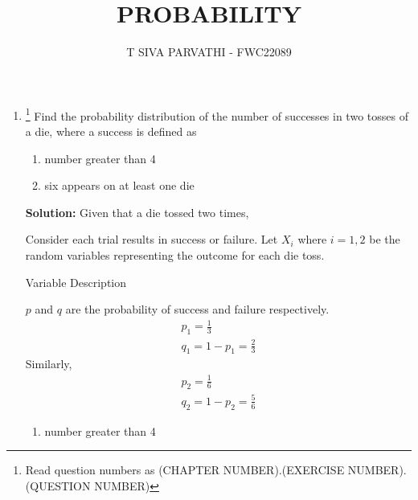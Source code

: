 \documentclass{article}
\newcommand{\solution}{\noindent \textbf{Solution: }}
\begin{document}
\title{PROBABILITY}
\author{\Large T SIVA PARVATHI - FWC22089}
\date{}

\maketitle
\begin{enumerate}[label=13.\arabic{enumi}.\arabic{enumii}]%
\setcounter{enumi}{3}
\setcounter{enumii}{5}

\item \footnote{Read question numbers as (CHAPTER NUMBER).(EXERCISE NUMBER).(QUESTION NUMBER)}
Find the probability distribution of the number of successes in two tosses of a die, where a success is defined as
\begin{enumerate}
\item number greater than 4
\item six appears on at least one die
\end{enumerate}

\solution
Given that a die tossed two times,

Consider each trial results in success or failure. Let $X_i$ where $i = 1,2$ be the random variables representing the outcome for each die toss. 
\begin{table}[h]\centering
	
	 \caption{Variable Description}\label{tab:}
\end{table}

$p$ and $q$ are the probability of success and failure respectively.
\begin{align}
& p_1 = \frac{1}{3}&             
\\            
& q_1 = 1 - p_1 = \frac{2}{3}&      
\end{align}
Similarly,
\begin{align}
& p_2 = \frac{1}{6}&             
\\            
& q_2 = 1 - p_2 = \frac{5}{6}&      
\end{align}
\begin{enumerate}
\item number greater than 4


\end{enumerate}
\end{enumerate}
\end{document}
